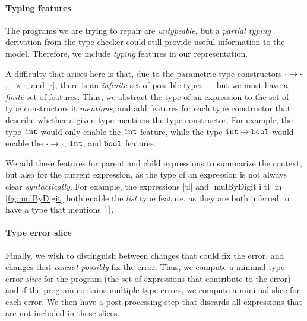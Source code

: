 \paragraph{Typing features}
The programs we are trying to repair are \emph{untypeable}, but a \emph{partial
typing} derivation from the type checker could still provide useful information
to the model. Therefore, we include \emph{typing} features in our
representation.

A difficulty that arises here is that, due to the parametric type constructors
$\cdot \to \cdot$, $\cdot \times \cdot$, and $[\cdot]$, there is an
\emph{infinite} set of possible types --- but we must have a \emph{finite} set
of features. Thus, we abstract the type of an expression to the set of type
constructors it \emph{mentions}, and add features for each type constructor that
describe whether a given type mentions the type constructor. For example, the
type $\mathtt{int}$ would only enable the $\mathtt{int}$ feature, while the type
$\mathtt{int} \to \mathtt{bool}$ would enable the $\cdot \to \cdot$, $\mathtt{int}$, and
$\mathtt{bool}$ features.

We add these features for parent and child expressions to summarize the context,
but also for the current expression, as the type of an expression is not always
clear \emph{syntactically}. For example, the expressions |tl| and
|mulByDigit i tl| in \autoref{fig:mulByDigit} both enable the \emph{list} type
feature, as they are both inferred to have a type that mentions $[\cdot]$.


\paragraph{Type error slice}
Finally, we wish to distinguish between changes that could fix the error, and
changes that \emph{cannot possibly} fix the error. Thus, we compute a minimal
type-error \emph{slice} for the program (\ie the set of expressions that
contribute to the error) and if the program contains multiple type-errors, we
compute a minimal slice for each error. We then have a post-processing step that
discards all expressions that are not included in those slices.


